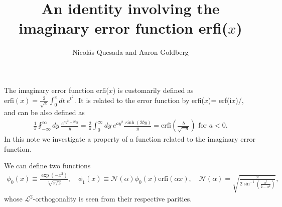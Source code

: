 \documentclass[11pt,letterpaper]{article}
\title{An identity involving the imaginary error function erfi($x$)}
\author{Nicol\'as Quesada and Aaron Goldberg}
\date{}
\newcommand{\eq}[1]{\begin{align}#1\end{align}}
\newcommand{\erfi}{\text{erfi}}
\newcommand{\iu}{\text{i}}
\begin{document}
\maketitle
The imaginary error function erfi($x$) is customarily defined as $\erfi(x) = \frac{2}{\sqrt{\pi}} \int_0^x dt \ e^{t^2}$.
It is related to the error function by erfi($x$)= erf($\iu x$)/\iu, and can be also defined as
\eq{
\frac{1}{\pi} \fint_{-\infty}^{\infty} dy\ \frac{e^{a y^2 +2 b y}}{ y} = \frac{2}{\pi}\int_0^\infty dy \ e^{a y^2}\frac{\sinh(2 b y)}{ y}=\erfi\left(\frac{b}{\sqrt{-a}}\right) \text{ for } a<0.
\label{eq:erfi-principal-integral}
}
In this note we investigate a property of a function related to the imaginary error function.

We can define two functions
\eq{
  \phi_0(x)\equiv\frac{\exp\left(-x^2\right)}{\sqrt[4]{\pi/2}}, 
\quad   \phi_1(x)\equiv%
\mathcal{N}\left(\alpha\right)\phi_0\left(x\right)\erfi\left(\alpha x\right),
\quad	\mathcal{N}\left(\alpha\right)=\sqrt{\frac{\pi}{2\sin^{-1}\left(\frac{\alpha^2}{2-\alpha^2}\right)}},
}
whose $\mathcal{L}^2$-orthogonality is seen from their respective parities. 
\end{document}
